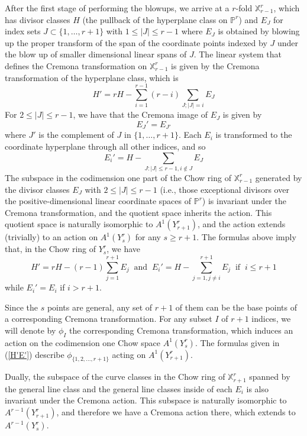 \documentclass[12pt]{article}
\numberwithin{equation}{section}
\numberwithin{subeq}{equation}
\def\bbP{\mathbb{P}}
\def\bbX{\mathbb{X}}
\begin{document}
After the first stage of performing the blowups, we arrive at a $r$-fold $\bbX^r_{r-1}$,
which has divisor classes
$H$ (the pullback of the hyperplane class on $\bbP^r$)
and $E_J$ for index sets $J \subset \{1,\ldots,r+1\}$ with $1 \leq |J| \leq r-1$
where $E_J$ is obtained by blowing up the proper transform of the span of the coordinate points indexed by $J$ under the blow up of smaller dimensional linear spans of $J$.
The linear system that defines the Cremona transformation on $\bbX^r_{r-1}$
is given by the Cremona transformation of the hyperplane class,
which is
\[
H' = rH - \sum_{i=1}^{r-1} (r-i)\sum_{J; |J|=i} E_J
\]
For $2 \leq |J| \leq r-1$, we have that the Cremona image of $E_J$ is given by
\[
E_J' = E_{J'}
\]
where $J'$ is the complement of $J$ in $\{1, \ldots, r+1\}$.
Each $E_i$ is transformed to the coordinate hyperplane through all other indices, and so
\[
E_i' = H - \sum_{J: |J|\leq r-1, i \notin J} E_J
\]
The subspace in the codimension one part of the Chow ring of $\bbX^r_{r-1}$
generated by the divisor classes $E_J$ with $2 \leq |J| \leq r-1$
(i.e., those exceptional divisors over the positive-dimensional linear coordinate spaces of $\bbP^r$)
is invariant under the Cremona transformation,
and the quotient space inherits the action.
This quotient space is naturally isomorphic to $A^1(Y^r_{r+1})$,
and the action extends (trivially) to an action on $A^1(Y^r_s)$ for any $s \geq r+1$.
The formulas above imply that, in the Chow ring of $Y^r_s$, we have
\begin{equation}\label{H'E'}
H' = rH-(r-1)\sum_{j=1}^{r+1} E_j \;\;\text{and}\;\;
E_i' = H - \sum_{j=1,j\neq i}^{r+1} E_j\;\;\text{if}\;\; i \leq r+1
\end{equation}
while $E_i' = E_i$ if $i > r+1$.

Since the $s$ points are general, any set of $r+1$ of them
can be the base points of a corresponding Cremona transformation.
For any subset $I$ of $r+1$ indices,
we will denote by $\phi_I$ the corresponding Cremona transformation,
which induces an action on the codimension one Chow space $A^1(Y^r_s)$.
The formulas given in (\ref{H'E'}) describe $\phi_{\{1,2,\ldots,r+1\}}$ acting on $A^1(Y^r_{r+1})$.

Dually, the subspace of the curve classes in the Chow ring of $\bbX^r_{r+1}$
spanned by the general line class and the general line classes inside of each $E_i$
is also invariant under the Cremona action.
This subspace is naturally isomorphic to $A^{r-1}(Y^r_{r+1})$,
and therefore we have a Cremona action there, which extends to $A^{r-1}(Y^r_s)$.
\end{document}
